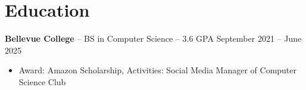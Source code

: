 \documentclass[11pt]{article}
\begin{document}

\vspace{-18.5pt}

\section*{Education}
\textbf{Bellevue College} -- BS in Computer Science -- 3.6 GPA \hfill September 2021 -- June 2025\\
\vspace{-9pt}
\begin{itemize}
  \item Award: Amazon Scholarship, Activities: Social Media Manager of Computer Science Club
\end{itemize}
\end{document}
